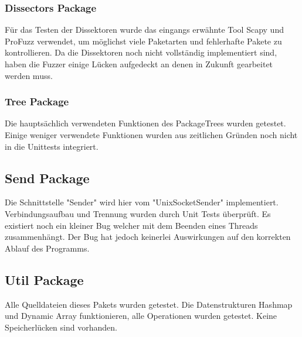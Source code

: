 		\subsubsection{Dissectors Package}
		Für das Testen der Dissektoren wurde das eingangs erwähnte Tool Scapy und ProFuzz verwendet, um möglichst viele Paketarten und fehlerhafte Pakete zu kontrollieren. Da die Dissektoren noch nicht vollständig implementiert sind, haben die Fuzzer einige Lücken aufgedeckt an denen in Zukunft gearbeitet werden muss.
		
		\subsubsection{Tree Package}
		Die hauptsächlich verwendeten Funktionen des PackageTrees wurden getestet. Einige weniger verwendete Funktionen wurden aus zeitlichen Gründen noch nicht in die Unittests integriert.
	
	\subsection{Send Package}
	Die Schnittstelle "{}Sender"{} wird hier vom "{}UnixSocketSender"{} implementiert. Verbindungsaufbau und Trennung wurden durch Unit Tests überprüft. Es existiert noch ein kleiner Bug welcher mit dem Beenden eines Threads zusammenhängt. Der Bug hat jedoch keinerlei Auswirkungen auf den korrekten Ablauf des Programms.
	
	\subsection{Util Package}
	Alle Quelldateien dieses Pakets wurden getestet. Die Datenstrukturen Hashmap und Dynamic Array funktionieren, alle Operationen wurden getestet. Keine Speicherlücken sind vorhanden.




